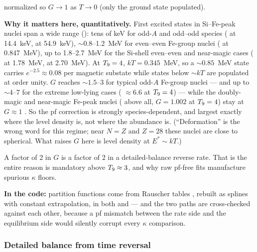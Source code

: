 normalized so $G \to 1$ as $T \to 0$ (only the ground state populated).

\textbf{Why it matters here, quantitatively.} First excited states in
Si--Fe-peak nuclei span a wide range (\citeauthor{ensdf}): tens of keV for odd-$A$ and
odd--odd species ( at 14.4~keV,  at 54.9~keV),
${\sim}0.8$--1.2~MeV for even--even Fe-group nuclei ( at
0.847~MeV), up to 1.8--2.7~MeV for the Si-shell even--even and near-magic cases
( at 1.78~MeV,  at 2.70~MeV). At $T_{9} = 4$,
$kT = 0.345$~MeV, so a ${\sim}0.85$~MeV state carries
$e^{-2.5} \approx 0.08$ per magnetic substate while states below ${\sim}kT$ are
populated at order unity. $G$ reaches ${\sim}1.5$--3 for typical odd-$A$
Fe-group nuclei --- and up to ${\sim}4$--7 for the extreme low-lying cases
( $\approx 6.6$ at $T_{9} = 4$) --- while the doubly-magic and
near-magic Fe-peak nuclei ( above all, $G = 1.002$ at $T_{9} = 4$)
stay at $G \approx 1$ \citep{rauscher2000,rauscher2003}. So the pf correction
is strongly species-dependent, and largest exactly where the level density is,
not where the abundance is. (``Deformation'' is the wrong word for this regime;
near $N = Z$ and $Z = 28$ these nuclei are close to spherical. What raises $G$
here is level density at $E^* \sim kT$.)

\begin{aside}
A factor of 2 in $G$ is a factor of 2 in a detailed-balance reverse rate. That
is the entire reason  is mandatory above
$T_{9} \approx 3$, and why raw pf-free fits manufacture spurious $\kappa$ floors.
\end{aside}

\begin{repopointer}
\textbf{In the code:} partition functions come from Rauscher tables
\citep[][--- the reverse-rate ratio is linear in $G$, so a factor of 2 in $G$
is exactly a factor of 2 in the reverse rate]{rauscher2000,rauscher2003},
rebuilt as splines with constant extrapolation, in both
 and  --- and the two paths are
cross-checked against each other, because a pf mismatch between the rate side
and the equilibrium side would silently corrupt every $\kappa$ comparison.
\end{repopointer}

\subsubsection{Detailed balance from time reversal}
\label{sec:detailedbalance}

